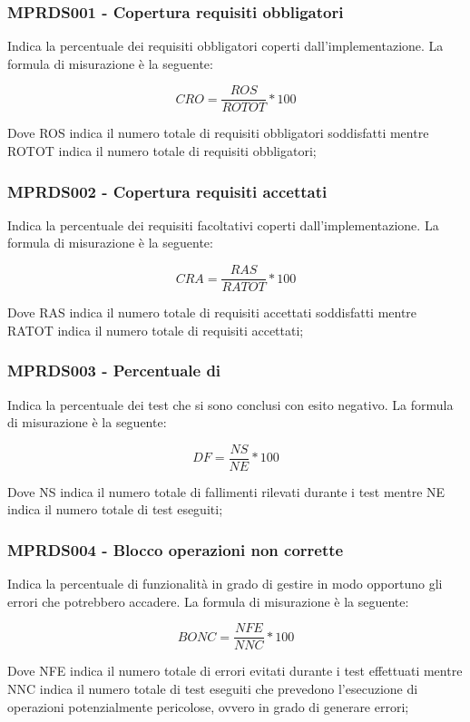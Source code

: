 {\subsubsection{MPRDS001 - Copertura requisiti obbligatori}
Indica la percentuale dei requisiti obbligatori coperti dall'implementazione. La formula di misurazione è la seguente:
\begin{center}
    \begin{displaymath}
        CRO = \frac{ROS}{ROTOT} * 100
    \end{displaymath}
\end{center}
Dove ROS indica il numero totale di requisiti obbligatori soddisfatti mentre ROTOT indica il numero totale di requisiti obbligatori;
\subsubsection{MPRDS002 - Copertura requisiti accettati}
Indica la percentuale dei requisiti facoltativi coperti dall'implementazione. La formula di misurazione è la seguente:
\begin{center}
    \begin{displaymath}
        CRA = \frac{RAS}{RATOT} * 100
    \end{displaymath}
\end{center}
Dove RAS indica il numero totale di requisiti accettati soddisfatti mentre RATOT indica il numero totale di requisiti accettati;
\subsubsection{MPRDS003 - Percentuale di }
Indica la percentuale dei test che si sono conclusi con esito negativo. La formula di misurazione è la seguente:
\begin{center}
    \begin{displaymath}
        DF = \frac{NS}{NE} * 100
    \end{displaymath}
\end{center}
Dove NS indica il numero totale di fallimenti rilevati durante i test mentre NE indica il numero totale di test eseguiti;
\subsubsection{MPRDS004 - Blocco operazioni non corrette}
Indica la percentuale di funzionalità in grado di gestire in modo opportuno gli errori che potrebbero accadere. La formula di misurazione è la seguente:
\begin{center}
    \begin{displaymath}
        BONC = \frac{NFE}{NNC} * 100
    \end{displaymath}
\end{center}
Dove NFE indica il numero totale di errori evitati durante i test effettuati mentre NNC indica il numero totale di test eseguiti che prevedono l'esecuzione di operazioni potenzialmente pericolose, ovvero in grado di generare errori;
}
